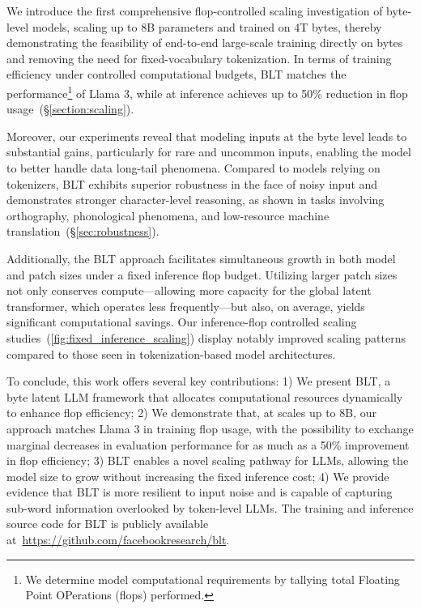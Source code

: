 We introduce the first comprehensive flop-controlled scaling investigation of byte-level models, scaling up to 8B parameters and trained on 4T bytes, thereby demonstrating the feasibility of end-to-end large-scale training directly on bytes and removing the need for fixed-vocabulary tokenization. In terms of training efficiency under controlled computational budgets, {\textsc BLT} matches the performance\footnote{We determine model computational requirements by tallying total Floating Point OPerations (flops) performed.} of Llama 3, while at inference achieves up to 50\% reduction in flop usage~(\S\ref{section:scaling}).

Moreover, our experiments reveal that modeling inputs at the byte level leads to substantial gains, particularly for rare and uncommon inputs, enabling the model to better handle data long-tail phenomena. Compared to models relying on tokenizers, {\textsc BLT} exhibits superior robustness in the face of noisy input and demonstrates stronger character-level reasoning, as shown in tasks involving orthography, phonological phenomena, and low-resource machine translation~(\S\ref{sec:robustness}).

Additionally, the {\textsc BLT} approach facilitates simultaneous growth in both model and patch sizes under a fixed inference flop budget. Utilizing larger patch sizes not only conserves compute—allowing more capacity for the global latent transformer, which operates less frequently—but also, on average, yields significant computational savings. Our inference-flop controlled scaling studies~(\autoref{fig:fixed_inference_scaling}) display notably improved scaling patterns compared to those seen in tokenization-based model architectures.

To conclude, this work offers several key contributions: 1) We present {\textsc BLT}, a byte latent LLM framework that allocates computational resources dynamically to enhance flop efficiency; 2) We demonstrate that, at scales up to 8B, our approach matches Llama 3 in training flop usage, with the possibility to exchange marginal decreases in evaluation performance for as much as a 50\% improvement in flop efficiency; 3) {\textsc BLT} enables a novel scaling pathway for LLMs, allowing the model size to grow without increasing the fixed inference cost; 4) We provide evidence that {\textsc BLT} is more resilient to input noise and is capable of capturing sub-word information overlooked by token-level LLMs. The training and inference source code for {\textsc BLT} is publicly available at~\url{https://github.com/facebookresearch/blt}.


